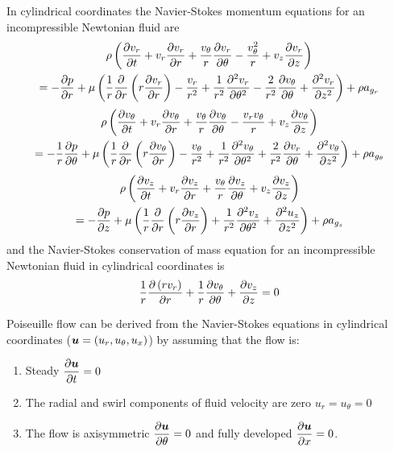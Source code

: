 In cylindrical coordinates the Navier-Stokes momentum equations for an incompressible Newtonian fluid are
\begin{multline}
  \rho\pbrac{\delby{v_{r}}{t}+v_{r}\delby{v_{r}}{r}+\dfrac{v_{\theta}}{r}\delby{v_{r}}{\theta}-\dfrac{v_{\theta}^{2}}{r}+
    v_{z}\delby{v_{r}}{z}}\\
  =-\delby{p}{r}+\mu\pbrac{\dfrac{1}{r}\delby{}{r}\pbrac{r\delby{v_{r}}{r}}-\dfrac{v_{r}}{r^{2}}+
    \dfrac{1}{r^{2}}\deltwosqby{v_{r}}{\theta}-\dfrac{2}{r^{2}}\delby{v_{\theta}}{\theta}+\deltwosqby{v_{r}}{z}}+
  \rho a_{g_{r}}
  \label{eqn:PoiseuilleRCylindricalNavierStokesMomentum}
\end{multline}
\begin{multline}
  \rho\pbrac{\delby{v_{\theta}}{t}+v_{r}\delby{v_{\theta}}{r}+\dfrac{v_{\theta}}{r}\delby{v_{\theta}}{\theta}-\dfrac{v_{r}v_{\theta}}{r}+
    v_{z}\delby{v_{\theta}}{z}}\\
  =-\dfrac{1}{r}\delby{p}{\theta}+\mu\pbrac{\dfrac{1}{r}\delby{}{r}\pbrac{r\delby{v_{\theta}}{r}}-
    \dfrac{v_{\theta}}{r^{2}}+\dfrac{1}{r^{2}}\deltwosqby{v_{\theta}}{\theta}+\dfrac{2}{r^{2}}\delby{v_{r}}{\theta}+
    \deltwosqby{v_{\theta}}{z}}+\rho a_{g_{\theta}}
  \label{eqn:PoiseuilleThetaCylindricalNavierStokesMomentum}
\end{multline}
\begin{multline}
  \rho\pbrac{\delby{v_{z}}{t}+v_{r}\delby{v_{z}}{r}+\dfrac{v_{\theta}}{r}\delby{v_{z}}{\theta}+v_{z}\delby{v_{z}}{z}}\\
  =-\delby{p}{z}+\mu\pbrac{\dfrac{1}{r}\delby{}{r}\pbrac{r\delby{v_{z}}{r}}+
   \dfrac{1}{r^{2}}\deltwosqby{v_{z}}{\theta}+\deltwosqby{u_{z}}{z}}+\rho a_{g_{z}}
  \label{eqn:PoiseuilleZCylindricalNavierStokesMomentum}
\end{multline}
and the Navier-Stokes conservation of mass equation for an incompressible Newtonian fluid in cylindrical coordinates is
\begin{equation}
  \dfrac{1}{r}\delby{\pbrac{rv_{r}}}{r}+\dfrac{1}{r}\delby{v_{\theta}}{\theta}+\delby{v_{z}}{z}=0
  \label{eqn:PoiseuilleCylindricalNavierStokesMass}
\end{equation}

Poiseuille flow can be derived from the Navier-Stokes equations in
cylindrical coordinates ($ \boldsymbol{u} =\left( u_{r},u_{\theta},u_{x} \right)$)
by assuming that the flow is: \begin{enumerate}
  \setlength{\itemsep}{1pt} \setlength{\parskip}{0pt}
  \setlength{\parsep}{0pt}
\item Steady \ie $ \dfrac{\partial  \boldsymbol{u} }{\partial t} =0$
\item The radial and swirl components of fluid velocity are zero \ie
  $u_{r}=u_{\theta}=0$ 
\item The flow is axisymmetric \ie $ \dfrac{\partial  \boldsymbol{u} }{\partial \theta} =0$ and fully developed
  \ie $ \dfrac{\partial  \boldsymbol{u} }{\partial x} =0$.
\end{enumerate}

